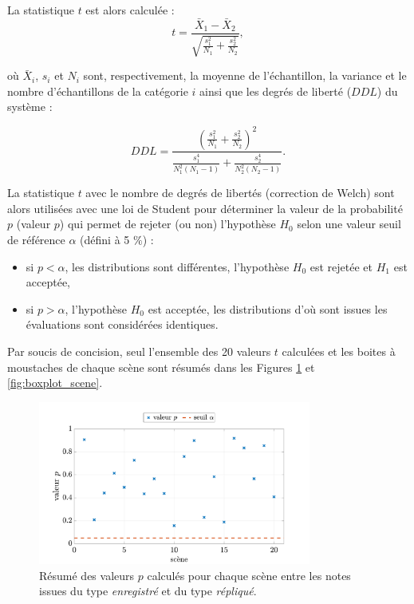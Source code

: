 La statistique $t$ est alors calculée :
\begin{equation}
t = \frac{\bar{X}_1-\bar{X}_2}{\sqrt{\frac{s_1^2}{N_1}+\frac{s_2^2}{N_2}}},
\end{equation}

où $\bar{X}_i$, $s_i$ et $N_i$ sont, respectivement, la moyenne de l'échantillon, la variance et le nombre d'échantillons de la catégorie $i$ ainsi que les degrés de liberté ($DDL$) du système :  

\begin{equation}
DDL = \frac{\left(\frac{s_1^2}{N_1}+\frac{s_2^2}{N_2} \right)^2}{\frac{s_1^4}{N_1^2(N_1-1)}+\frac{s_2^4}{N_2^2(N_2-1)}}.
\end{equation}

La statistique $t$ avec le nombre de degrés de libertés (correction de Welch) sont alors utilisées avec une loi de Student pour déterminer la valeur de la probabilité $p$ (valeur $p$) qui permet de rejeter (ou non) l'hypothèse $H_0$ selon une valeur seuil de référence $\alpha$ (défini à 5 $\%$) :

\begin{itemize}
\item si $p < \alpha$, les distributions sont différentes, l'hypothèse $H_0$ est rejetée et $H_1$ est acceptée,
\item si $p > \alpha$, l'hypothèse $H_0$ est acceptée, les distributions d'où sont issues les évaluations sont considérées identiques.\\
\end{itemize}

Par soucis de concision, seul l'ensemble des 20 valeurs $t$ calculées et les boites à moustaches de chaque scène sont résumés dans les Figures \ref{fig:test-student} et \ref{fig:boxplot_scene}.

\begin{figure}[ht]
\centering
\includegraphics[width = 0.8\textwidth]{./figures/test_perceptif/t-value-student.pdf}
\caption{Résumé des valeurs $p$ calculés pour chaque scène entre les notes issues du type \textit{enregistré} et du type \textit{répliqué}.}\label{fig:test-student}
\end{figure}


